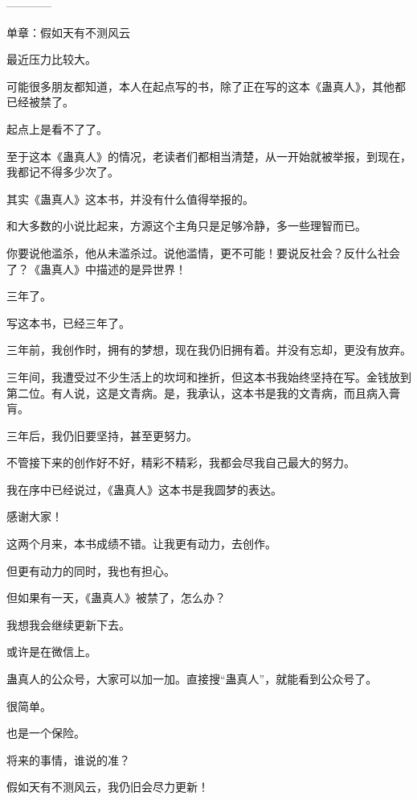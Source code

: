 \begin{this_body}
------------

单章：假如天有不测风云

最近压力比较大。

可能很多朋友都知道，本人在起点写的书，除了正在写的这本《蛊真人》，其他都已经被禁了。

起点上是看不了了。

至于这本《蛊真人》的情况，老读者们都相当清楚，从一开始就被举报，到现在，我都记不得多少次了。

其实《蛊真人》这本书，并没有什么值得举报的。

和大多数的小说比起来，方源这个主角只是足够冷静，多一些理智而已。

你要说他滥杀，他从未滥杀过。说他滥情，更不可能！要说反社会？反什么社会了？《蛊真人》中描述的是异世界！

三年了。

写这本书，已经三年了。

三年前，我创作时，拥有的梦想，现在我仍旧拥有着。并没有忘却，更没有放弃。

三年间，我遭受过不少生活上的坎坷和挫折，但这本书我始终坚持在写。金钱放到第二位。有人说，这是文青病。是，我承认，这本书是我的文青病，而且病入膏肓。

三年后，我仍旧要坚持，甚至更努力。

不管接下来的创作好不好，精彩不精彩，我都会尽我自己最大的努力。

我在序中已经说过，《蛊真人》这本书是我圆梦的表达。

感谢大家！

这两个月来，本书成绩不错。让我更有动力，去创作。

但更有动力的同时，我也有担心。

但如果有一天，《蛊真人》被禁了，怎么办？

我想我会继续更新下去。

或许是在微信上。

蛊真人的公众号，大家可以加一加。直接搜“蛊真人”，就能看到公众号了。

很简单。

也是一个保险。

将来的事情，谁说的准？

假如天有不测风云，我仍旧会尽力更新！

\end{this_body}

